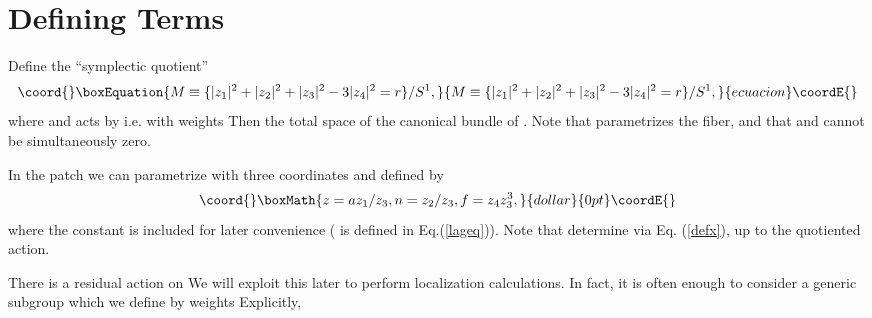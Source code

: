 \documentclass[a4paper,11pt]{article}
\providecommand{\PP}{{\mathbb{P}}}
\begin{document}
\section{Defining Terms}
\label{sec:def}
Define the ``symplectic quotient''
\begin{equation}\coord{}\boxEquation{
\label{defx}
M \equiv \lbrace |z_1|^2 + |z_2|^2 + |z_3|^2 - 3|z_4|^2 = r
\rbrace /S^1,
}{
M \equiv \lbrace |z_1|^2 + |z_2|^2 + |z_3|^2 - 3|z_4|^2 = r
\rbrace /S^1,
}{ecuacion}\coordE{}\end{equation}
where \coordHE{} and \coordHE{} acts by \coordHE{} i.e. with weights \coordHE{}
Then \myHighlight{$M\cong K_{\PP^2},$}\coordHE{} the total space of the canonical
bundle of \myHighlight{$\PP^2$}\coordHE{}.
Note that \coordHE{} parametrizes the fiber, and that \coordHE{}  \coordHE{}
and \coordHE{} cannot be simultaneously zero.

In the patch \coordHE{} we can parametrize \coordHE{} with three coordinates
\coordHE{}  \coordHE{} and \coordHE{} defined by
$$\coord{}\boxMath{z = a z_1/z_3, n = z_2/z_3, f = z_4 z_3^3,}{dollar}{0pt}\coordE{}$$
where the constant \coordHE{} is included
for later convenience
(\coordHE{} is defined in Eq.\!\!\!(\ref{lageq})).
Note that \coordHE{} determine \coordHE{} via Eq.\!\!\!
(\ref{defx}), up to the quotiented \coordHE{} action.

There is a residual \coordHE{} action on \coordHE{}  We will exploit this
later to perform localization calculations.  In fact, it is often
enough to consider a generic subgroup \coordHE{}
which we define by weights \coordHE{}
Explicitly, \coordHE{}
\end{document}
